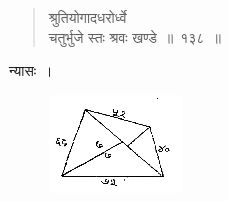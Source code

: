 \documentclass[11pt, openany]{book}
\begin{document}
\begin{quote}
    \bs 
श्रुतियोगादधरोर्ध्वे\\
चतुर्भुजे स्तः श्रवः खण्डे~॥~१३८~॥
\end{quote}

न्यासः~। 
\vspace{-2mm}

\begin{figure}[h!]
    \centering
    \includegraphics[scale=0.85]{graphics/capture177.png}
\end{figure}
\vspace{-2mm}
\end{document}
